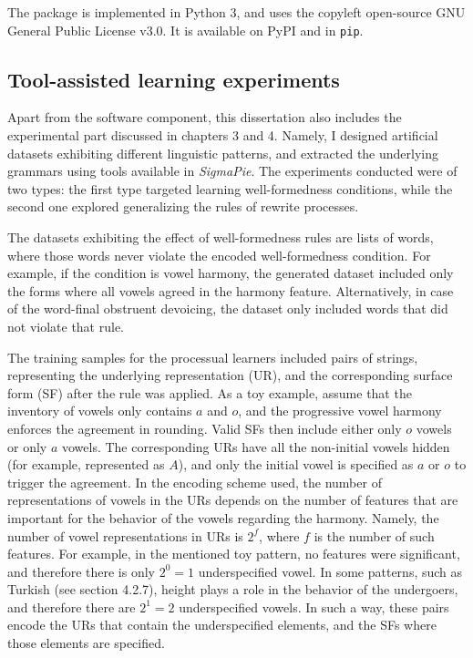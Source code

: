 The package is implemented in Python 3, and uses the copyleft open-source GNU General Public License v3.0.
It is available on PyPI and in \texttt{pip}.



\subsection{Tool-assisted learning experiments}

Apart from the software component, this dissertation also includes the experimental part discussed in chapters 3 and 4.
Namely, I designed artificial datasets exhibiting different linguistic patterns, and extracted the underlying grammars using tools available in \emph{SigmaPie}.
The experiments conducted were of two types: the first type targeted learning well-formedness conditions, while the second one explored generalizing the rules of rewrite processes.

The datasets exhibiting the effect of well-formedness rules are lists of words, where those words never violate the encoded well-formedness condition.
For example, if the condition is vowel harmony, the generated dataset included only the forms where all vowels agreed in the harmony feature.
Alternatively, in case of the word-final obstruent devoicing, the dataset only included words that did not violate that rule.

The training samples for the processual learners included pairs of strings, representing the underlying representation (UR), and the corresponding surface form (SF) after the rule was applied.
As a toy example, assume that the inventory of vowels only contains $a$ and $o$, and the progressive vowel harmony enforces the agreement in rounding.
Valid SFs then include either only $o$ vowels or only $a$ vowels.
The corresponding URs have all the non-initial vowels hidden (for example, represented as $A$), and only the initial vowel is specified as $a$ or $o$ to trigger the agreement.
In the encoding scheme used, the number of representations of vowels in the URs depends on the number of features that are important for the behavior of the vowels regarding the harmony.
Namely, the number of vowel representations in URs is $2^f$, where $f$ is the number of such features.
For example, in the mentioned toy pattern, no features were significant, and therefore there is only $2^0 = 1$ underspecified vowel.
In some patterns, such as Turkish (see section 4.2.7), height plays a role in the behavior of the undergoers, and therefore there are $2^1 = 2$ underspecified vowels.
In such a way, these pairs encode the URs that contain the underspecified elements, and the SFs where those elements are specified.

